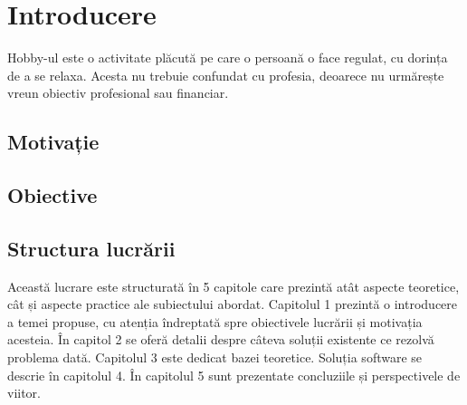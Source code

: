 \chapter{Introducere}

\label{intro}

Hobby-ul este o activitate plăcută pe care o persoană o face regulat, cu dorința de a se relaxa. Acesta nu trebuie confundat cu profesia, deoarece nu urmărește vreun obiectiv profesional sau financiar.

\section{Motivație}
\label{section:ch1sec1}


\section{Obiective}
\label{section:ch1sec2}


\section{Structura lucrării}
\label{section:ch1sec3}

Această lucrare este structurată în 5 capitole care prezintă atât aspecte teoretice, cât și aspecte practice ale subiectului abordat. Capitolul 1 prezintă o introducere a temei propuse, cu atenția îndreptată spre obiectivele lucrării și motivația acesteia. În capitol 2 se oferă detalii despre câteva soluții existente ce rezolvă problema dată. Capitolul 3 este dedicat bazei teoretice. Soluția software se descrie în capitolul 4. În capitolul 5 sunt prezentate concluziile și perspectivele de viitor.